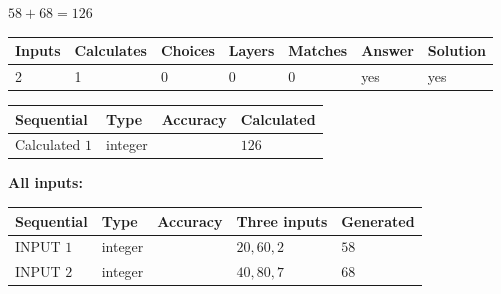 \documentclass[12pt]{article}
\begin{document}
 

 
 
 
\noindent{}
 
 

$ %
58 +  %
68=   %
126$
 
 
\noindent{}
 
 

 
   
   
   
   
\noindent\begin{tabular}{|l|l|l|l|l|l|l|}
 \hline
Inputs & Calculates & Choices & Layers & Matches & Answer & Solution \\ \hline
 2  & 
 1  & 
 0
  & 
 0  & 
 0  & 
  yes & 
  yes 
  \\ \hline
 \end{tabular}
   
   
   
   
\noindent{}
   
   
  
  
\noindent\begin{tabular}{|l|l|l|l|}
\hline
 Sequential & Type & Accuracy & Calculated \\ 
\hline
 
 
  Calculated $  1 $ & integer &  & 
  $ 126 $ 
 \\  \hline  
 \end{tabular}
   
   
   
   
\noindent\vspace{0.1in}\hspace{-0.08in} {\textbf{\Large{All inputs: }}}
   
   
  
  
\noindent\begin{tabular}{|l|l|l|l|l|}
\hline
 Sequential & Type & Accuracy & Three inputs & Generated \\ 
\hline
 
 
  INPUT $  1 $ & integer &  & $
 20
 , 
 60
 , 
 2
 $ & $ 58 $ 
 \\  \hline  
 
 
  INPUT $  2 $ & integer &  & $
 40
 , 
 80
 , 
 7
 $ & $ 68 $ 
 \\  \hline  
 \end{tabular}
   
\end{document}
